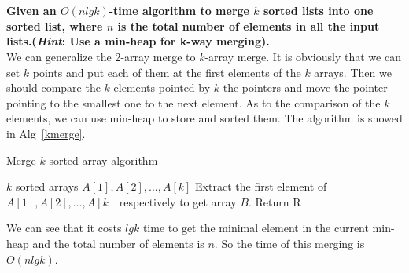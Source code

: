 
\chapter{}
\textbf{
Given an $O(n lgk)$-time algorithm to merge $k$ sorted lists into one sorted list, where $n$ is the total number of elements in all the input lists.(\emph{Hint}: Use a min-heap for k-way merging).
}
\hspace*{\fill} \\

We can generalize the 2-array merge to $k$-array merge. It is obviously that we can set $k$ points and put each of them at the first elements of the $k$ arrays. Then we should compare the $k$ elements pointed by $k$ the pointers and move the pointer pointing to the smallest one to the next element. As to the comparison of the $k$ elements, we can use min-heap to store and sorted them. The algorithm is showed in Alg~\ref{kmerge}.

\begin{algorithm}
\caption{Merge $k$ sorted array algorithm}
\label{kmerge}
\begin{algorithmic}[1]
\REQUIRE $k$ sorted arrays $A[1],A[2],...,A[k]$
\STATE Extract the first element of $A[1],A[2],...,A[k]$ respectively to get array $B$.
    \ELSE
    \ENDIF
\ENDWHILE
\STATE Return R
\end{algorithmic}
\end{algorithm}

We can see that it costs $lg k$ time to get the minimal element in the current min-heap and the total number of elements is $n$. So the time of this merging is $O(n lg k)$.
